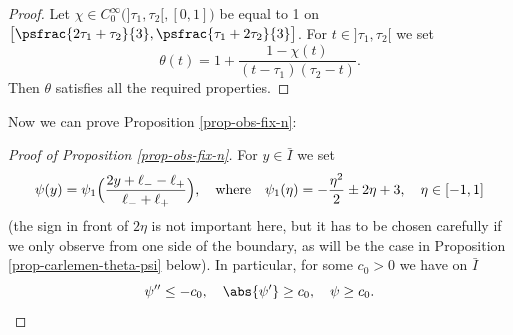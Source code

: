 \begin{proof}
Let $\chi \in C_0^\infty \bigl(]\tau_1,\tau_2[,[0,1] \bigr)$ be equal to 1 on $\big[\psfrac{2\tau_1 + \tau_2}{3},\psfrac{\tau_1 + 2\tau_2}{3} \big]$. For $t \in{}]\tau_1,\tau_2[$ we set
\[
\theta (t) = 1 + \frac{1 - \chi(t)}{(t-\tau_1)(\tau_2-t)}.
\]
Then $\theta$ satisfies all the required properties.
\end{proof}

Now we can prove Proposition \ref{prop-obs-fix-n}:

\begin{proof}[Proof of Proposition \ref{prop-obs-fix-n}]
For $y \in \bar I$ we set
\[
\psi(y) = \psi_1 \Bigl(\frac {2y + \ell_- - \ell_+}{\ell_- + \ell_+} \Bigr), \quad \text{where} \quad \psi_1(\eta) = - \frac {\eta^2} 2 \pm 2 \eta + 3, \quad \eta\in[-1,1]
\]
(the sign in front of $2\eta$ is not important here, but it has to be chosen carefully if we only observe from one side of the boundary, as will be the case in Proposition \ref{prop-carlemen-theta-psi} below).
In particular, for some $c_0 > 0$ we have on $\bar I$
\begin{equation} \label{eq-prop-psi}
\psi'' \leq - c_0, \quad \abs{\psi'} \geq c_0, \quad \psi \geq c_0.
\end{equation}


\end{proof}
